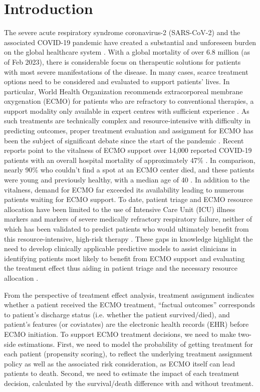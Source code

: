 \section{Introduction}

The severe acute respiratory syndrome coronavirus-2 (SARS-CoV-2) and the associated COVID-19 pandemic have created a substantial and unforeseen burden on the global healthcare system \cite{abrams2020ecmo}. With a global mortality of over 6.8 million (as of Feb 2023), there is considerable focus on therapeutic solutions for patients with most severe manifestations of the disease. In many cases, scarce treatment options need to be considered and evaluated to support patients' lives. In particular, World Health Organization recommends extracorporeal membrane oxygenation (ECMO) for patients who are refractory to conventional therapies, a support modality only available in expert centres with sufficient experience \cite{world2021covid}. As such treatments are technically complex and resource-intensive with difficulty in predicting outcomes, proper treatment evaluation and assignment for ECMO has been the subject of significant debate since the start of the pandemic \cite{falcoz2020extracorporeal,haiduc2020role}. 
Recent reports point to the vitalness of ECMO support over 14,000 reported COVID-19 patients with an overall hospital mortality of approximately 47\% \cite{ELSO}. In comparison, nearly 90\% who couldn't find a spot at an ECMO center died, and these patients were young and previously healthy, with a median age of 40 \cite{gannon2022association}. In addition to the vitalness, demand for ECMO far exceeded its availability leading to numerous patients waiting for ECMO support. To date, patient triage and ECMO resource allocation have been limited to the use of Intensive Care Unit (ICU) illness markers and markers of severe medically refractory respiratory failure, neither of which has been validated to predict patients who would ultimately benefit from this resource-intensive, high-risk therapy \cite{salyer2021first,shekar2020extracorporeal}. 
These gaps in knowledge highlight the need to develop clinically applicable predictive models to assist clinicians in identifying patients most likely to benefit from ECMO support and evaluating the treatment effect thus aiding in patient triage and the necessary resource allocation \cite{salyer2021first,huang2021role}.

From the perspective of treatment effect analysis, treatment assignment indicates whether a patient received the ECMO treatment, “factual outcomes” corresponds to patient’s discharge status (i.e. whether the patient survived/died), and patient’s features (or coviatates) are the electronic health records (EHR) before ECMO initiation. To support ECMO treatment decisions, we need to make two-side estimations. First, we need to model the probability of getting treatment for each patient (propensity scoring), to reflect the underlying treatment assignment policy \cite{rubin} as well as the associated risk consideration, as ECMO itself can lead patients to death. Second, we need to estimate the impact of each treatment decision, calculated by the survival/death difference with and without treatment.


